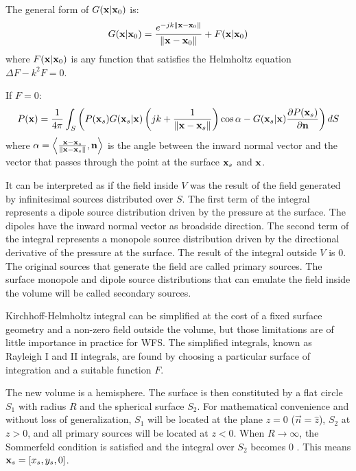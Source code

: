 The general form of $G(\PosTheo \vert \PosTheo_0)$ is:
\begin{equation}
G(\PosTheo \vert \PosTheo_0) = \GreenFunc[\PosTheo - \PosTheo_0] + F(\PosTheo \vert \PosTheo_0)
\label{GreensFunction}
\end{equation}
where $F(\PosTheo \vert \PosTheo_0)$ is any function that satisfies the Helmholtz equation $\Delta F - k^2 F = 0$.

If $F = 0$:
\begin{equation}
P(\PosTheo) = \frac{1}{4\pi} \int_{S} \left(P(\PosTheo[surface]) G(\PosTheo[surface] \vert \PosTheo)\left(jk + \frac{1}{\norm{\PosTheo - \PosTheo[surface]}}\right)\cos\normSecondPropAngle - G(\PosTheo[surface] \vert \PosTheo) \frac{\partial P(\PosTheo[surface])}{\partial \mathbf{n}} \right) dS
\end{equation}
where $\normSecondPropAngle = \left\langle \frac{\PosTheo - \PosTheo[surface]}{\norm{\PosTheo - \PosTheo[surface]}} , \vec{n} \right\rangle$ is the angle between the inward normal vector and the vector that passes through the point at the surface $\PosTheo[surface]$ and $\PosTheo$.

It can be interpreted as if the field inside $V$ was the result of the field generated by infinitesimal sources distributed over $S$. The first term of the integral represents a dipole source distribution driven by the pressure at the surface. The dipoles have the inward normal vector as broadside direction. The second term of the integral represents a monopole source distribution driven by the directional derivative of the pressure at the surface. The result of the integral outside $V$ is $0$. The original sources that generate the field are called primary sources. The surface monopole and dipole source distributions that can emulate the field inside the volume will be called secondary sources.

Kirchhoff-Helmholtz integral can be simplified at the cost of a fixed surface geometry and a non-zero field outside the volume, but those limitations are of little importance in practice for WFS. The simplified integrals, known as Rayleigh I and II integrals, are found by choosing a particular surface of integration and a suitable function $F$.

The new volume is a hemisphere. The surface is then constituted by a flat circle $S_1$ with radius $R$ and the spherical surface $S_2$. For mathematical convenience and without loss of generalization, $S_1$ will be located at the plane $z=0$ ($\vec{n} = \hat{z}$), $S_2$ at $z>0$, and all primary sources will be located at $z<0$. When $R\rightarrow\infty$, the Sommerfeld condition is satisfied and the integral over $S_2$ becomes $0$ \cite{Verheijen}. This means $\PosTheo[surface] = [x_s, y_s, 0]$.

